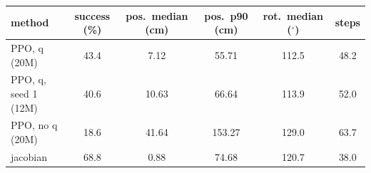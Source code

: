 \begin{tabular}{lccccc}
\hline
method & success (\%) & pos.\ median (cm) & pos.\ p90 (cm) & rot.\ median ($^\circ$) & steps \\
\hline
PPO, q (20M) & 43.4 & 7.12 & 55.71 & 112.5 & 48.2 \\
PPO, q, seed 1 (12M) & 40.6 & 10.63 & 66.64 & 113.9 & 52.0 \\
PPO, no q (20M) & 18.6 & 41.64 & 153.27 & 129.0 & 63.7 \\
jacobian & 68.8 & 0.88 & 74.68 & 120.7 & 38.0 \\
\hline
\end{tabular}
